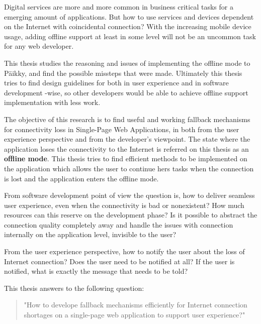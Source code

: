 Digital services are more and more common in business critical tasks for a emerging amount of applications. But how to use services and devices dependent on the Internet with coincidental connection? With the increasing mobile device usage, adding offline support at least in some level will not be an uncommon task for any web developer.

This thesis studies the reasoning and issues of implementing the offline mode to Päikky, and find the possible missteps that were made. Ultimately this thesis tries to find design guidelines for both in user experience and in software development -wise, so other developers would be able to achieve offline support implementation with less work.




The objective of this research is to find useful and working fallback mechanisms for connectivity loss in Single-Page Web Applications, in both from the user experience perspective and from the developer's viewpoint. The state where the application loses the connectivity to the Internet is referred on this thesis as an \textbf{offline mode}. This thesis tries to find efficient methods to be implemented on the application which allows the user to continue hers tasks when the connection is lost and the application enters the offline mode.

From software development point of view the question is, how to deliver seamless user experience, even when the connectivity is bad or nonexistent? How much resources can this reserve on the development phase? Is it possible to abstract the connection quality completely away and handle the issues with connection internally on the application level, invisible to the user?

From the user experience perspective, how to notify the user about the loss of Internet connection? Does the user need to be notified at all? If the user is notified, what is exactly the message that needs to be told? 






This thesis answers to the following question: 
\begin{quote}
"How to develope fallback mechanisms efficiently for Internet connection shortages on a single-page web application to support user experience?"
\end{quote}





